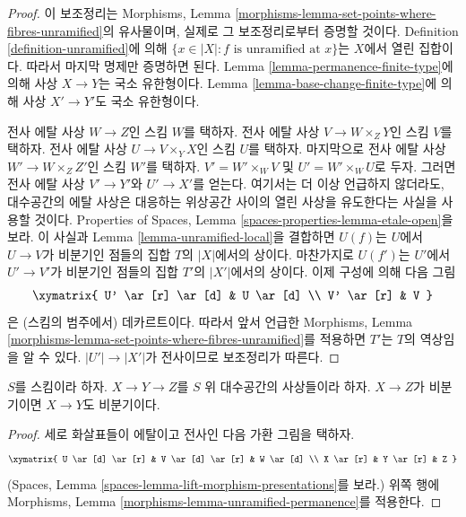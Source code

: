 \begin{proof}
이 보조정리는
Morphisms, Lemma \ref{morphisms-lemma-set-points-where-fibres-unramified}의
유사물이며, 실제로 그 보조정리로부터 증명할 것이다. Definition
\ref{definition-unramified}에 의해
$\{x \in |X| : f \text{ is unramified at }x\}$는 $X$에서 열린 집합이다.
따라서 마지막 명제만 증명하면 된다.
Lemma \ref{lemma-permanence-finite-type}에 의해 사상 $X \to Y$는
국소 유한형이다. Lemma \ref{lemma-base-change-finite-type}에 의해
사상 $X' \to Y'$도 국소 유한형이다.

\medskip\noindent
전사 에탈 사상 $W \to Z$인 스킴 $W$를 택하자.
전사 에탈 사상 $V \to W \times_Z Y$인 스킴 $V$를 택하자.
전사 에탈 사상 $U \to V \times_Y X$인 스킴 $U$를 택하자.
마지막으로 전사 에탈 사상 $W' \to W \times_Z Z'$인 스킴 $W'$를 택하자.
$V' = W' \times_W V$ 및 $U' = W' \times_W U$로 두자. 그러면
전사 에탈 사상 $V' \to Y'$와 $U' \to X'$를 얻는다.
여기서는 더 이상 언급하지 않더라도, 대수공간의 에탈 사상은 대응하는
위상공간 사이의 열린 사상을 유도한다는 사실을 사용할 것이다. Properties
of Spaces, Lemma \ref{spaces-properties-lemma-etale-open}을 보라.
이 사실과 Lemma \ref{lemma-unramified-local}을 결합하면 $U(f)$는
$U$에서 $U \to V$가 비분기인 점들의 집합 $T$의 $|X|$에서의 상이다.
마찬가지로 $U(f')$는 $U'$에서 $U' \to V'$가 비분기인 점들의 집합
$T'$의 $|X'|$에서의 상이다. 이제 구성에 의해 다음 그림
$$
\xymatrix{
U' \ar[r] \ar[d] & U \ar[d] \\
V' \ar[r] & V
}
$$
은 (스킴의 범주에서) 데카르트이다. 따라서 앞서 언급한 Morphisms, Lemma
\ref{morphisms-lemma-set-points-where-fibres-unramified}를 적용하면
$T'$는 $T$의 역상임을 알 수 있다. $|U'| \to |X'|$가 전사이므로
보조정리가 따른다.
\end{proof}

\begin{lemma}
\label{lemma-permanence-unramified}
$S$를 스킴이라 하자.
$X \to Y \to Z$를 $S$ 위 대수공간의 사상들이라 하자.
$X \to Z$가 비분기이면 $X \to Y$도 비분기이다.
\end{lemma}

\begin{proof}
세로 화살표들이 에탈이고 전사인 다음 가환 그림을 택하자.
$$
\xymatrix{
U \ar[d] \ar[r] & V \ar[d] \ar[r] & W \ar[d] \\
X \ar[r] & Y \ar[r] & Z
}
$$
(Spaces, Lemma \ref{spaces-lemma-lift-morphism-presentations}를 보라.)
위쪽 행에 Morphisms, Lemma
\ref{morphisms-lemma-unramified-permanence}를 적용한다.
\end{proof}






